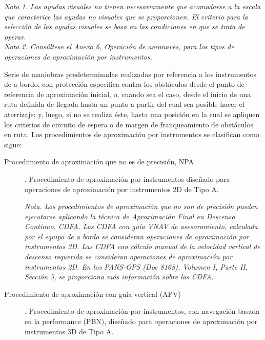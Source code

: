 \begin{tcolorbox}[title={
    OACI. Anexo 14. Edición 2018
  }
  ]
{\begin{enumerate}[a)]
\end{enumerate}

\emph{Nota 1. Las ayudas visuales no tienen necesariamente que acomodarse a la escala que caracterice las ayudas no visuales que se proporcionen. El criterio para la selección de las ayudas visuales se basa en las condiciones en que se trata de operar. \\
Nota 2. Consúltese el Anexo 6,  Operación de aeronaves, para los tipos de operaciones de aproximación por
instrumentos.
}


  }
  
\end{tcolorbox}

\begin{tcolorbox}[title={Procedimiento de aproximación por instrumentos (IAP). OACI Anexo 6. Edición 2018}]
  {\footnotesize

    Serie de maniobras predeterminadas realizadas por referencia a los instrumentos de a bordo, con protección específica contra los obstáculos desde el punto de referencia de aproximación inicial, o, cuando sea el caso, desde el inicio de una ruta definida de llegada hasta un punto a partir del cual sea posible hacer el aterrizaje; y, luego, si no se realiza éste, hasta una posición en la cual se apliquen los criterios de circuito de espera o de margen de franqueamiento de obstáculos en ruta. Los procedimientos de aproximación por instrumentos se clasifican como sigue:
    
    \begin{description}
    \item [Procedimiento de aproximación que no es de precisión, \ac{NPA}]. Procedimiento de aproximación por instrumentos diseñado para operaciones de aproximación por instrumentos 2D de Tipo A.

\emph{Nota. Los procedimientos de aproximación que no son de precisión pueden ejecutarse aplicando la técnica de
Aproximación Final en Descenso Continuo, \ac{CDFA}. Las \ac{CDFA} con guía \ac{VNAV} de asesoramiento, calculada por el equipo de
a bordo se consideran operaciones de aproximación por instrumentos 3D. Las \ac{CDFA} con cálculo manual de la velocidad
vertical de descenso requerida se consideran operaciones de aproximación por instrumentos 2D. En los PANS-OPS
(Doc 8168), Volumen I, Parte II, Sección 5, se proporciona más información sobre las CDFA.
}

\item [Procedimiento de aproximación con guía vertical (APV)]. Procedimiento de aproximación por instrumentos, con
navegación basada en la performance (PBN), diseñado para operaciones de aproximación por instrumentos 3D de
Tipo A.


\end{description}}
\end{tcolorbox}
